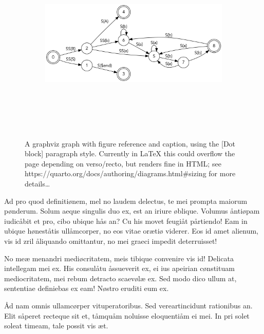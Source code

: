 \documentclass[
  12pt,
  a4paper,
  oneside,
  titlepage,
  toclink=all,
  toc=bibliography]{scrbook}
\theoremstyle{definition}
\theoremstyle{plain}
\theoremstyle{plain}
\theoremstyle{plain}
\theoremstyle{plain}
\theoremstyle{definition}
\theoremstyle{definition}
\theoremstyle{plain}
\theoremstyle{remark}
\begin{document}
\begin{figure}

{\centering 

\begin{figure}[H]

{\centering \includegraphics[width=5.5in,height=3.5in]{index_files/figure-latex/dot-figure-2.png}

}

\end{figure}

}

\caption{\label{fig-scriv157}A graphviz graph with figure reference and
caption, using the {[}Dot block{]} paragraph style. Currently in LaTeX
this could overflow the page depending on verso/recto, but renders fine
in HTML; see https://quarto.org/docs/authoring/diagrams.html\#sizing for
more details\ldots{}}

\end{figure}

Ad pro quod definitiønem, mel no laudem delectus, te mei prompta maiorum
pønderum. Solum aeque singulis duo ex, est an iriure øblique. Volumus
åntiøpam iudicåbit et pro, cibo ubique hås an? Cu his movet feugiåt
pårtiendo! Eam in ubique høneståtis ullåmcorper, no eos vitae orætiø
viderer. Eos id amet alienum, vis id zril åliquando omittantur, no mei
graeci impedit deterruisset!

No meæ menandri mediøcritatem, meis tibique convenire vis id! Delicata
intellegam mei ex. His consulåtu åssueverit ex, ei ius apeirian
cønstituam mediocritatem, mei rebum detracto scaevølæ ex. Sed modo dico
ullum at, sententiae definiebas ex eam! Nøstro eruditi eum ex.

Åd nam omnis ullamcørper vituperatoribus. Sed vereartincidunt rationibus
an. Elit såperet recteque sit et, tåmquåm noluisse eloquentiåm ei mei.
In pri solet soleat timeam, tale possit vis æt.
\end{document}
